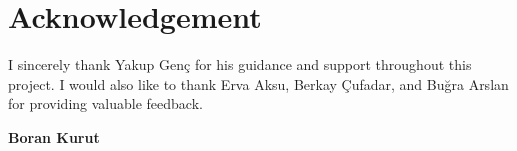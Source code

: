 \chapter*{Acknowledgement}


I sincerely thank Yakup Genç for his guidance and support throughout this project.
I would also like to thank Erva Aksu, Berkay Çufadar, and Buğra Arslan for providing valuable feedback.



\vspace{1cm}
\begin{flushright}
\textbf{Boran Kurut} %
\end{flushright}
\clearpage
